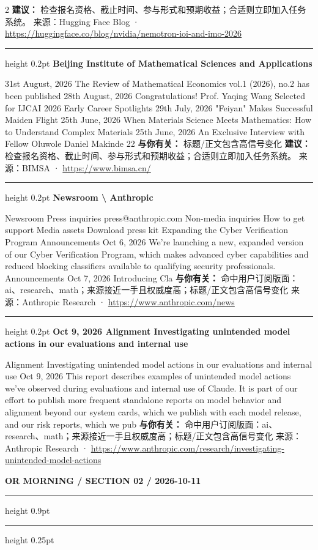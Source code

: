 \documentclass[10.5pt]{ctexart}
\begin{document}
\begin{multicols}{2}
\textbf{建议：} 检查报名资格、截止时间、参与形式和预期收益；合适则立即加入任务系统。
{\footnotesize\color{ormuted} 来源：Hugging Face Blog · \url{https://huggingface.co/blog/nvidia/nemotron-ioi-and-imo-2026}}
\vspace{2mm}
\hrule height 0.2pt
\vspace{2mm}
{\large\bfseries Beijing Institute of Mathematical Sciences and Applications}\par
31st August, 2026 The Review of Mathematical Economics vol.1 (2026), no.2 has been published 28th August, 2026 Congratulations! Prof. Yaqing Wang Selected for IJCAI 2026 Early Career Spotlights 29th July, 2026 "Feiyan" Makes Successful Maiden Flight 25th June, 2026 When Materials Science Meets Mathematics: How to Understand Complex Materials 25th June, 2026 An Exclusive Interview with Fellow Oluwole Daniel Makinde 22
\textbf{与你有关：} 标题/正文包含高信号变化
\textbf{建议：} 检查报名资格、截止时间、参与形式和预期收益；合适则立即加入任务系统。
{\footnotesize\color{ormuted} 来源：BIMSA · \url{https://www.bimsa.cn/}}
\vspace{2mm}
\hrule height 0.2pt
\vspace{2mm}
{\large\bfseries Newsroom \textbackslash{} Anthropic}\par
Newsroom Press inquiries press@anthropic.com Non-media inquiries How to get support Media assets Download press kit Expanding the Cyber Verification Program Announcements Oct 6, 2026 We’re launching a new, expanded version of our Cyber Verification Program, which makes advanced cyber capabilities and reduced blocking classifiers available to qualifying security professionals. Announcements Oct 7, 2026 Introducing Cla
\textbf{与你有关：} 命中用户订阅版面：ai、research、math；来源接近一手且权威度高；标题/正文包含高信号变化
{\footnotesize\color{ormuted} 来源：Anthropic Research · \url{https://www.anthropic.com/news}}
\vspace{2mm}
\hrule height 0.2pt
\vspace{2mm}
{\large\bfseries Oct 9, 2026 Alignment Investigating unintended model actions in our evaluations and internal use}\par
Alignment Investigating unintended model actions in our evaluations and internal use Oct 9, 2026 This report describes examples of unintended model actions we’ve observed during evaluations and internal use of Claude. It is part of our effort to publish more frequent standalone reports on model behavior and alignment beyond our system cards, which we publish with each model release, and our risk reports, which we pub
\textbf{与你有关：} 命中用户订阅版面：ai、research、math；来源接近一手且权威度高；标题/正文包含高信号变化
{\footnotesize\color{ormuted} 来源：Anthropic Research · \url{https://www.anthropic.com/research/investigating-unintended-model-actions}}
\end{multicols}
\newpage
{\small\bfseries OR MORNING / SECTION 02 / 2026-10-11}
\vspace{2mm}
\hrule height 0.9pt
\vspace{1.5mm}
\hrule height 0.25pt
\vspace{4mm}
\end{document}
